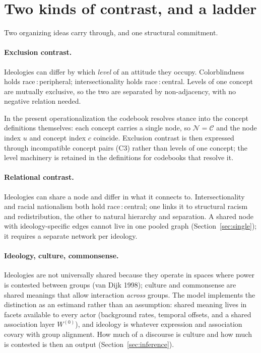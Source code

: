 \documentclass[11pt]{article}
\newcommand{\CC}{\mathcal{C}}
\newcommand{\NN}{\mathcal{N}}
\newcommand{\1}{\mathbb{1}}
\newcommand{\node}[2]{\textsf{#1\,:\,#2}}
\begin{document}
\section{Two kinds of contrast, and a ladder}\label{sec:contrast}

Two organizing ideas carry through, and one structural commitment.

\paragraph{Exclusion contrast.} Ideologies can differ by which \emph{level} of an attitude they occupy. Colorblindness holds \node{race}{peripheral}; intersectionality holds \node{race}{central}. Levels of one concept are mutually exclusive, so the two are separated by non-adjacency, with no negative relation needed.

In the present operationalization the codebook resolves stance into the concept definitions themselves: each concept carries a single node, so $\NN=\CC$ and the node index $u$ and concept index $c$ coincide. Exclusion contrast is then expressed through incompatible concept pairs (C3) rather than levels of one concept; the level machinery is retained in the definitions for codebooks that resolve it.

\paragraph{Relational contrast.} Ideologies can share a node and differ in what it connects to. Intersectionality and racial nationalism both hold \node{race}{central}; one links it to structural racism and redistribution, the other to natural hierarchy and separation. A shared node with ideology-specific edges cannot live in one pooled graph (Section~\ref{sec:single}); it requires a separate network per ideology.

\paragraph{Ideology, culture, commonsense.} Ideologies are not universally shared because they operate in spaces where power is contested between groups (van Dijk 1998); culture and commonsense are shared meanings that allow interaction \emph{across} groups. The model implements the distinction as an estimand rather than an assumption: shared meaning lives in facets available to every actor (background rates, temporal offsets, and a shared association layer $W^{(0)}$), and ideology is whatever expression and association covary with group alignment. How much of a discourse is culture and how much is contested is then an output (Section~\ref{sec:inference}).
\end{document}
